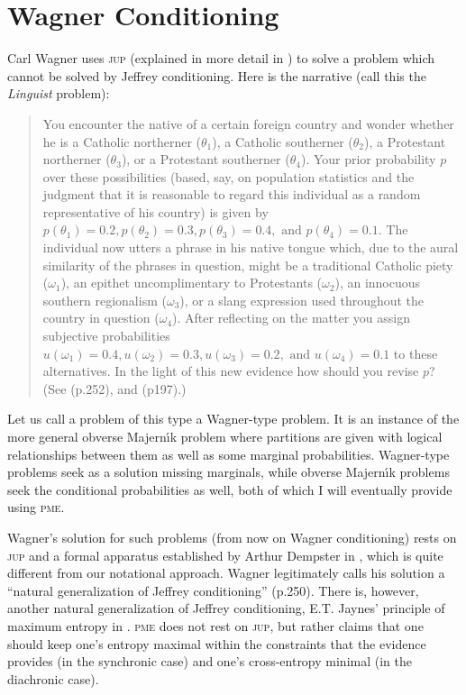 \documentclass[entropy,article,accept,oneauthor,pdftex,12pt,a4paper]{mdpi}
\newcommand{\qeins}[1]{``#1''}
\newenvironment{quotex}{\begin{quote}\begin{footnotesize}}{\end{footnotesize}\end{quote}}
\begin{document}
\section{Wagner Conditioning}
\label{wc}

Carl Wagner uses \textsc{jup} (explained in more detail in \cite{ref-32}) to
solve a problem which cannot be solved by Jeffrey conditioning. Here
is the narrative (call this the \emph{Linguist} problem):

\begin{quotex}
  You encounter the native of a certain foreign country and wonder
  whether he is a Catholic northerner ($\theta_{1}$), a Catholic
  southerner ($\theta_{2}$), a Protestant northerner ($\theta_{3}$),
  or a Protestant southerner ($\theta_{4}$). Your prior probability
  $p$ over these possibilities (based, say, on population statistics
  and the judgment that it is reasonable to regard this individual as
  a random representative of his country) is given by
  $p(\theta_{1})=0.2,p(\theta_{2})=0.3,p(\theta_{3})=0.4,\mbox{ and
  }p(\theta_{4})=0.1$. The individual now utters a phrase in his
  native tongue which, due to the aural similarity of the phrases in
  question, might be a traditional Catholic piety ($\omega_{1}$), an
  epithet uncomplimentary to Protestants ($\omega_{2}$), an innocuous
  southern regionalism ($\omega_{3}$), or a slang expression used
  throughout the country in question ($\omega_{4}$). After reflecting
  on the matter you assign subjective probabilities
  $u(\omega_{1})=0.4,u(\omega_{2})=0.3,u(\omega_{3})=0.2,\mbox{ and
  }u(\omega_{4})=0.1$ to these alternatives. In the light of this new
  evidence how should you revise $p$? (See \cite{ref-31} (p.252), and
  \cite{ref-27}(p197).)
\end{quotex}

Let us call a problem of this type a Wagner-type problem. It is an
instance of the more general obverse Majern{\'\i}k problem where partitions
are given with logical relationships between them as well as some
marginal probabilities. Wagner-type problems seek as a solution
missing marginals, while obverse Majern{\'\i}k problems seek the
conditional probabilities as well, both of which I will eventually
provide using \textsc{pme}.

Wagner's solution for such problems (from now on Wagner conditioning)
rests on \textsc{jup} and a formal apparatus established by Arthur
Dempster in \cite{ref-5}, which is quite different from our notational
approach. Wagner legitimately calls his solution a \qeins{natural
  generalization of Jeffrey conditioning} \cite{ref-31} (p.250). There is,
however, another natural generalization of Jeffrey conditioning, E.T.
Jaynes' principle of maximum entropy in \cite{ref-10}. \textsc{pme} does not
rest on \textsc{jup}, but rather claims that one should keep one's
entropy maximal within the constraints that the evidence provides (in
the synchronic case) and one's cross-entropy minimal (in the
diachronic case).
\end{document}
